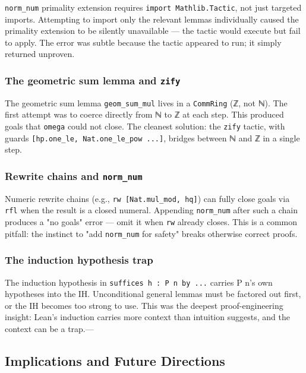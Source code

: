 \documentclass[12pt,a4paper]{article}
\begin{document}
\texttt{norm\_num} primality extension requires \texttt{import Mathlib.Tactic}, not just targeted imports. Attempting to import only the relevant lemmas individually caused the primality extension to be silently unavailable --- the tactic would execute but fail to apply. The error was subtle because the tactic appeared to run; it simply returned unproven.

\subsubsection{The geometric sum lemma and \texttt{zify}}

The geometric sum lemma \texttt{geom\_sum\_mul} lives in a \texttt{CommRing} (ℤ, not ℕ). The first attempt was to coerce directly from ℕ to ℤ at each step. This produced goals that \texttt{omega} could not close. The cleanest solution: the \texttt{zify} tactic, with guards \texttt{{[}hp.one\_le, Nat.one\_le\_pow ...{]}}, bridges between ℕ and ℤ in a single step.

\subsubsection{Rewrite chains and \texttt{norm\_num}}

Numeric rewrite chains (e.g., \texttt{rw {[}Nat.mul\_mod, hq{]}}) can fully close goals via \texttt{rfl} when the result is a closed numeral. Appending \texttt{norm\_num} after such a chain produces a "no goals" error --- omit it when \texttt{rw} already closes. This is a common pitfall: the instinct to "add \texttt{norm\_num} for safety" breaks otherwise correct proofs.

\subsubsection{The induction hypothesis trap}

The induction hypothesis in \texttt{suffices h : P n by ...} carries P n's own hypotheses into the IH. Unconditional general lemmas must be factored out first, or the IH becomes too strong to use. This was the deepest proof-engineering insight: Lean's induction carries more context than intuition suggests, and the context can be a trap.---

\subsection{Implications and Future Directions}
\end{document}
